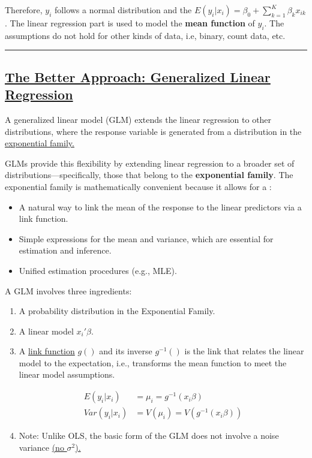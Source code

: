 \documentclass[
  letterpaper,
  DIV=11,
  numbers=noendperiod]{scrreprt}
\providecommand{\tightlist}{%
  \setlength{\itemsep}{0pt}\setlength{\parskip}{0pt}}\usepackage{longtable,booktabs,array}
\begin{document}
Therefore, \(y_i\) follows a normal distribution and the
\(E(y_i|x_i) = \beta_0 + \sum_{k=1}^K \beta_k x_{ik}\). The linear
regression part is used to model the \textbf{mean function} of \(y_i\).
The assumptions do not hold for other kinds of data, i.e, binary, count
data, etc.

\begin{center}\rule{0.5\linewidth}{0.5pt}\end{center}

\hypertarget{the-better-approach-generalized-linear-regression}{%
\subsection*{\texorpdfstring{\ul{The Better Approach: Generalized Linear
Regression}}{The Better Approach: Generalized Linear Regression}}\label{the-better-approach-generalized-linear-regression}}

A generalized linear model (GLM) extends the linear regression to other
distributions, where the response variable is generated from a
distribution in the \ul{exponential family.}

GLMs provide this flexibility by extending linear regression to a
broader set of distributions---specifically, those that belong to the
\textbf{exponential family}. The exponential family is mathematically
convenient because it allows for a :

\begin{itemize}
\tightlist
\item
  A natural way to link the mean of the response to the linear
  predictors via a link function.
\item
  Simple expressions for the mean and variance, which are essential for
  estimation and inference.
\item
  Unified estimation procedures (e.g., MLE).
\end{itemize}

A GLM involves three ingredients:

\begin{enumerate}
\def\labelenumi{\arabic{enumi}.}
\item
  A probability distribution in the Exponential Family.
\item
  A linear model \(x_i'\beta\).
\item
  A \ul{link function} \(g()\) and its inverse \(g^{-1}()\) is the link
  that relates the linear model to the expectation, i.e., transforms the
  mean function to meet the linear model assumptions.

  \[
  \begin{align*}
  E(y_i|x_i) & = \mu_i = g^{-1} (x_i\beta)\\
  Var(y_i|x_i) & = V(\mu_i) =V(g^{-1}(x_i\beta))
  \end{align*}
  \]
\item
  Note: Unlike OLS, the basic form of the GLM does not involve a noise
  variance \ul{(no \(\sigma^2\)).}
\end{enumerate}
\end{document}
